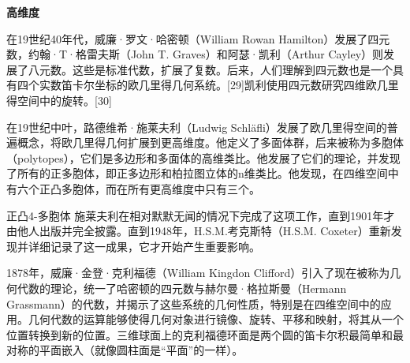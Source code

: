 \textbf{高维度}

在19世纪40年代，威廉·罗文·哈密顿（William Rowan Hamilton）发展了四元数，约翰·T·格雷夫斯（John T. Graves）和阿瑟·凯利（Arthur Cayley）则发展了八元数。这些是标准代数，扩展了复数。后来，人们理解到四元数也是一个具有四个实数笛卡尔坐标的欧几里得几何系统。[29]凯利使用四元数研究四维欧几里得空间中的旋转。[30]

在19世纪中叶，路德维希·施莱夫利（Ludwig Schläfli）发展了欧几里得空间的普遍概念，将欧几里得几何扩展到更高维度。他定义了多面体群，后来被称为多胞体（polytopes），它们是多边形和多面体的高维类比。他发展了它们的理论，并发现了所有的正多胞体，即正多边形和柏拉图立体的n维类比。他发现，在四维空间中有六个正凸多胞体，而在所有更高维度中只有三个。

正凸4-多胞体
施莱夫利在相对默默无闻的情况下完成了这项工作，直到1901年才由他人出版并完全披露。直到1948年，H.S.M.考克斯特（H.S.M. Coxeter）重新发现并详细记录了这一成果，它才开始产生重要影响。

1878年，威廉·金登·克利福德（William Kingdon Clifford）引入了现在被称为几何代数的理论，统一了哈密顿的四元数与赫尔曼·格拉斯曼（Hermann Grassmann）的代数，并揭示了这些系统的几何性质，特别是在四维空间中的应用。几何代数的运算能够使得几何对象进行镜像、旋转、平移和映射，将其从一个位置转换到新的位置。三维球面上的克利福德环面是两个圆的笛卡尔积最简单和最对称的平面嵌入（就像圆柱面是“平面”的一样）。